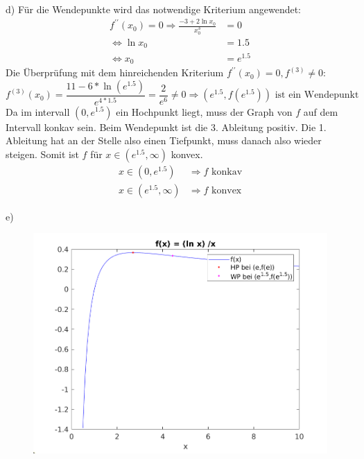 \documentclass[a4paper]{article}
\begin{document}
\newpage
\setlength{\headheight}{0cm} 

\par{d)} Für die Wendepunkte wird das notwendige Kriterium angewendet:
\begin{align*}
	f^{\prime\prime} (x_0)= 0 \Rightarrow \frac{-3+2 \ln x_0}{x_0^3} &= 0\\
	\Leftrightarrow \ln x_0 &= 1.5 \\
	\Leftrightarrow x_0 &= e^{1.5}
\end{align*}
Die Überprüfung mit dem hinreichenden Kriterium $f^{\prime\prime} (x_0) = 0, f^{(3)} \neq 0$:
\[ 
	f^{(3)} (x_0) = \frac{11 - 6*\ln(e^{1.5})}{e^{4*1.5}} = \frac{2}{e^6} \neq 0 
	\Longrightarrow (e^{1.5}, f(e^{1.5})) \text{ ist ein Wendepunkt}
\]
Da im intervall $(0,e^{1.5})$ ein Hochpunkt liegt, muss der Graph von $f$ auf dem Intervall konkav sein. Beim Wendepunkt ist die 3. Ableitung positiv. Die 1. Ableitung hat an der Stelle also einen Tiefpunkt, muss danach also wieder steigen. Somit ist $f$ für $x \in (e^{1.5}, \infty) $ konvex.
\begin{align*}
	x \in (0,e^{1.5}) &\Rightarrow f \text{ konkav} \\
	x \in (e^{1.5}, \infty) &\Rightarrow f \text{ konvex}
\end{align*}
\par{e)}
\begin{figure}[h]
	\includegraphics[width=15cm]{aufgabe1_plot.png}
\end{figure}
\newpage
\end{document}
